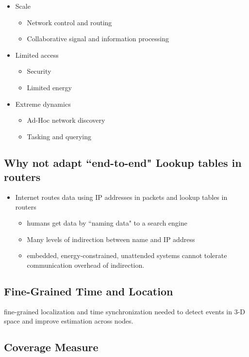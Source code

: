 \documentclass[letterpaper,10pt]{article}
\begin{document}
\begin{itemize}
	\item Scale
	\begin{itemize}
		\item Network control and routing
		\item Collaborative signal and information processing
	\end{itemize}
	\item Limited access
	\begin{itemize}
		\item Security
		\item Limited energy
	\end{itemize}
	\item Extreme dynamics
	\begin{itemize}
		\item Ad-Hoc network discovery
		\item Tasking and querying
	\end{itemize}
\end{itemize}

\subsection{Why not adapt ``end-to-end" Lookup tables in routers}

\begin{itemize}
	\item Internet routes data using IP addresses in packets and lookup tables in routers
	\begin{itemize}
		\item humans get data by ``naming data" to a search engine
		\item Many levels of indirection between name and IP address
		\item embedded, energy-constrained, unattended systems cannot tolerate communication overhead of indirection.
	\end{itemize}
\end{itemize}

\subsection{Fine-Grained Time and Location}

fine-grained localization and time synchronization needed to detect events in 3-D space and improve estimation across nodes.

\subsection{Coverage Measure}
\end{document}
